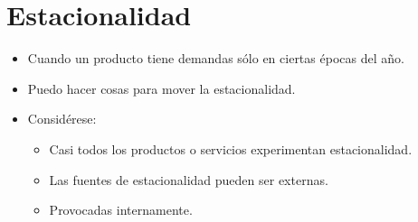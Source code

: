 \section{Estacionalidad}
\begin{itemize}
    \item Cuando un producto tiene demandas sólo en ciertas épocas del año.
    \item Puedo hacer cosas para mover la estacionalidad.
    \item Considérese:
        \begin{itemize}
            \item Casi todos los productos o servicios experimentan estacionalidad.
            \item Las fuentes de estacionalidad pueden ser externas.
            \item Provocadas internamente.  
        \end{itemize}
\end{itemize}
